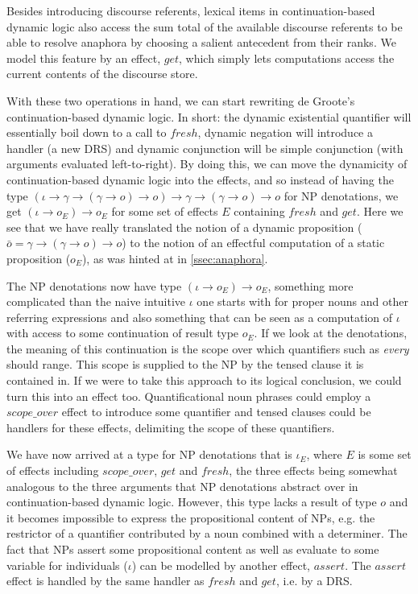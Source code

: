 \documentclass{article}
\begin{document}
Besides introducing discourse referents, lexical items in continuation-based
dynamic logic also access the sum total of the available discourse referents
to be able to resolve anaphora by choosing a salient antecedent from their
ranks. We model this feature by an effect, $get$, which simply lets
computations access the current contents of the discourse store.

With these two operations in hand, we can start rewriting de Groote's
continuation-based dynamic logic. In short: the dynamic existential quantifier
will essentially boil down to a call to $fresh$, dynamic negation will
introduce a handler (a new DRS) and dynamic conjunction will be simple
conjunction (with arguments evaluated left-to-right). By doing this, we can
move the dynamicity of continuation-based dynamic logic into the effects, and
so instead of having the type $(\iota \to \gamma \to (\gamma \to o) \to o) \to
\gamma \to (\gamma \to o) \to o$ for NP denotations, we get $(\iota \to o_E)
\to o_E$ for some set of effects $E$ containing $fresh$ and $get$. Here we see
that we have really translated the notion of a dynamic proposition ($\bar{o} =
\gamma \to (\gamma \to o) \to o$) to the notion of an effectful computation of
a static proposition ($o_E$), as was hinted at in \ref{ssec:anaphora}.

The NP denotations now have type $(\iota \to o_E) \to o_E$, something more
complicated than the naive intuitive $\iota$ one starts with for proper nouns
and other referring expressions and also something that can be seen as a
computation of $\iota$ with access to some continuation of result type
$o_E$. If we look at the denotations, the meaning of this continuation is the
scope over which quantifiers such as \emph{every} should range. This scope is
supplied to the NP by the tensed clause it is contained in. If we were to take
this approach to its logical conclusion, we could turn this into an effect
too. Quantificational noun phrases could employ a $scope\_over$ effect to
introduce some quantifier and tensed clauses could be handlers for these
effects, delimiting the scope of these quantifiers.

We have now arrived at a type for NP denotations that is $\iota_E$, where $E$
is some set of effects including $scope\_over$, $get$ and $fresh$, the three
effects being somewhat analogous to the three arguments that NP denotations
abstract over in continuation-based dynamic logic. However, this type lacks a
result of type $o$ and it becomes impossible to express the propositional
content of NPs, e.g. the restrictor of a quantifier contributed by a noun
combined with a determiner. The fact that NPs assert some propositional
content as well as evaluate to some variable for individuals ($\iota$) can be
modelled by another effect, $assert$. The $assert$ effect is handled by the
same handler as $fresh$ and $get$, i.e. by a DRS.
\end{document}
